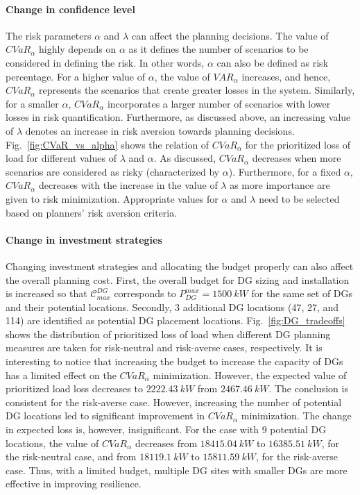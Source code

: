 \paragraph{Change in confidence level}
The risk parameters $\alpha$ and $\lambda$ can affect the planning decisions. The value of $CVaR_\alpha$ highly depends on $\alpha$ as it defines the number of scenarios to be considered in defining the risk. In other words, $\alpha$ can also be defined as risk percentage. For a higher value of $\alpha$, the value of $VAR_\alpha$ increases, and hence, $CVaR_\alpha$ represents the scenarios that create greater losses in the system. Similarly, for a smaller $\alpha$, $CVaR_\alpha$ incorporates a larger number of scenarios with lower losses in risk quantification. Furthermore, as discussed above, an increasing value of $\lambda$ denotes an increase in risk aversion towards planning decisions. Fig.~\ref{fig:CVaR_vs_alpha} shows the relation of $CVaR_\alpha$ for the prioritized loss of load for different values of $\lambda$ and $\alpha$. As discussed, $CVaR_\alpha$ decreases when more scenarios are considered as risky (characterized by $\alpha$). Furthermore, for a fixed $\alpha$, $CVaR_\alpha$ decreases with the increase in the value of $\lambda$ as more importance are given to risk minimization. Appropriate values for $\alpha$ and $\lambda$ need to be selected based on planners' risk aversion criteria.

\paragraph{Change in investment strategies}
Changing investment strategies and allocating the budget properly can also affect the overall planning cost. First, the overall budget for DG sizing and installation is increased so that $\mathcal{C}^{DG}_{max}$ corresponds to $P_{DG}^{max} = 1500~kW$ for the same set of DGs and their potential locations. Secondly, 3 additional DG locations (47, 27, and 114) are identified as potential DG placement locations. Fig.~\ref{fig:DG_tradeoffs} shows the distribution of prioritized loss of load when different DG planning measures are taken for risk-neutral and risk-averse cases, respectively. It is interesting to notice that increasing the budget to increase the capacity of DGs has a limited effect on the $CVaR_\alpha$ minimization. However, the expected value of prioritized load loss decreases to $2222.43~kW$ from $2467.46~kW$. The conclusion is consistent for the risk-averse case. However, increasing the number of potential DG locations led to significant improvement in $CVaR_\alpha$ minimization. The change in expected loss is, however, insignificant. For the case with 9 potential DG locations, the value of $CVaR_\alpha$ decreases from $18415.04~kW$ to $16385.51~kW$, for the risk-neutral case, and from $18119.1~kW$ to $15811.59~kW$, for the risk-averse case. Thus, with a limited budget, multiple DG sites with smaller DGs are more effective in improving resilience. 

